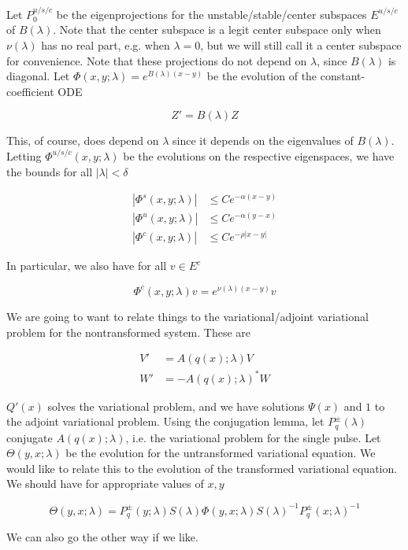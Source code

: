 \documentclass[12pt]{article}
\begin{document}
Let $P^{u/s/c}_0$ be the eigenprojections for the unstable/stable/center subspaces $E^{u/s/c}$ of $B(\lambda)$. Note that the center subspace is a legit center subspace only when $\nu(\lambda)$ has no real part, e.g. when $\lambda = 0$, but we will still call it a center subspace for convenience. Note that these projections do not depend on $\lambda$, since $B(\lambda)$ is diagonal. Let $\Phi(x, y; \lambda) = e^{B(\lambda)(x-y)}$ be the evolution of the constant-coefficient ODE

\[
Z' = B(\lambda) Z
\]

This, of course, does depend on $\lambda$ since it depends on the eigenvalues of $B(\lambda)$. Letting $\Phi^{u/s/c}(x, y; \lambda)$ be the evolutions on the respective eigenspaces, we have the bounds for all $|\lambda| < \delta$

\begin{align*}
|\Phi^s(x, y; \lambda)| &\leq C e^{-\alpha(x - y)} \\
|\Phi^u(x, y; \lambda)| &\leq C e^{-\alpha(y - x)} \\
|\Phi^c(x, y; \lambda)| &\leq C e^{-\rho|x - y|} 
\end{align*}

In particular, we also have for all $v \in E^c$

\[
\Phi^c(x, y; \lambda) v = e^{\nu(\lambda)(x - y)} v
\]

We are going to want to relate things to the variational/adjoint variational problem for the nontransformed system. These are

\begin{align*}
V' &= A(q(x); \lambda) V \\
W' &= -A(q(x); \lambda)^* W
\end{align*}

$Q'(x)$ solves the variational problem, and we have solutions $\Psi(x)$ and $1$ to the adjoint variational problem. Using the conjugation lemma, let $P_q^\pm(\lambda)$ conjugate $A(q(x); \lambda)$, i.e. the variational problem for the single pulse. Let $\Theta(y, x; \lambda)$ be the evolution for the untransformed variational equation. We would like to relate this to the evolution of the transformed variational equation. We should have for appropriate values of $x, y$

\[
\Theta(y, x; \lambda) = P_q^\pm(y; \lambda) S(\lambda) \Phi(y, x; \lambda) S(\lambda)^{-1} P_q^\pm(x; \lambda)^{-1}
\]

We can also go the other way if we like.\\
\end{document}
